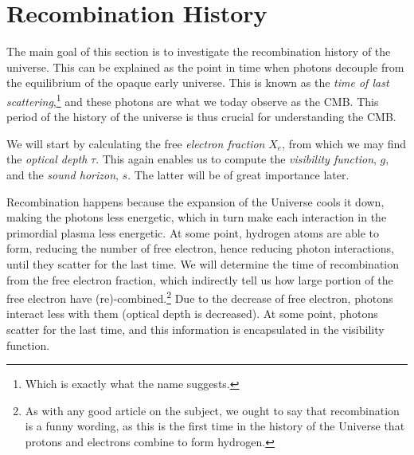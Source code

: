 \section{Recombination History}\label{sec:m2}

The main goal of this section is to investigate the recombination history of the universe. This can be explained as the point in time when photons decouple from the equilibrium of the opaque early universe.  This is known as the \textit{time of last scattering},\footnote{Which is exactly what the name suggests.} and these photons are what we today observe as the CMB. This period of the history of the universe is thus crucial for understanding the CMB. 

We will start by calculating the free \textit{electron fraction} $X_e$, from which we may find the \textit{optical depth} $\tau$. This again enables us to compute the \textit{visibility function}, $g$, and the \textit{sound horizon}, $s$. The latter will be of great importance later. 

Recombination happens because the expansion of the Universe cools it down, making the photons less energetic, which in turn make each interaction in the primordial plasma less energetic. At some point, hydrogen atoms are able to form, reducing the number of free electron, hence reducing photon interactions, until they scatter for the last time. We will determine the time of recombination from the free electron fraction, which indirectly tell us how large portion of the free electron have (re)-combined.\footnote{As with any good article on the subject, we ought to say that recombination is a funny wording, as this is the first time in the history of the Universe that protons and electrons combine to form hydrogen.} Due to the decrease of free electron, photons interact less with them (optical depth is decreased). At some point, photons scatter for the last time, and this information is encapsulated in the visibility function. 






